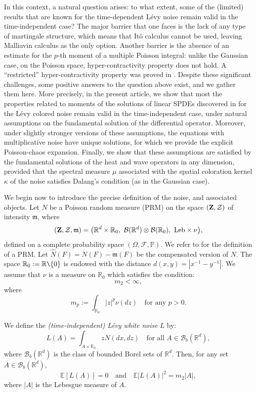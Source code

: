 \documentclass[12pt]{article}
\def\cB{\mathcal{B}}
\def\cF{\mathcal{F}}
\def\cZ{\mathcal{Z}}
\def\bE{\mathbb{E}}
\def\bP{\mathbb{P}}
\def\bR{\mathbb{R}}
\def\k{\kappa}
\newcommand{\fm}{\mathfrak{m}}
\begin{document}
In this context, a natural question arises: to what extent, some of the (limited) results that are known for the time-dependent L\'evy noise remain valid in the time-independent case? The major barrier that one faces is the lack of any type of martingale structure, which means that It\^o calculus cannot be used, leaving Malliavin calculus as the only option. Another barrier is the absence of an estimate for the $p$-th moment of a multiple Poisson integral: unlike the Gaussian case, on the Poisson space, hyper-contractivity property does not hold. A ``restricted'' hyper-contractivity property was proved in \cite{NPY19}. Despite these significant challenges, some positive answers to the question above exist, and we gather them here. More precisely, in the present article, we show that most the properties related to moments of the solutions of  linear SPDEs discovered in \cite{BJ26} for the L\'evy colored noise remain valid in the time-independent case, under natural assumptions on the fundamental solution of the differential operator. Moreover, under slightly stronger versions of these assumptions, the equations with multiplicative noise have unique solutions, for which we provide the explicit Poisson-chaos expansion. Finally, we show that these assumptions are satisfied by the fundamental solutions of the heat and wave operators in any dimension, provided that the spectral measure $\mu$ associated with the spatial coloration kernel $\k$ of the noise satisfies Dalang's condition (as in the Gaussian case).


\medskip

We begin now to introduce the precise definition of the noise, and associated objects.
Let $N$ be a Poisson random measure (PRM) on the space $({\bf Z},\cZ)$ of intensity $\fm$, where
\begin{equation}
\label{def-Z}
({\bf Z},\cZ,\fm)=\big(\bR^d \times \bR_0,\ \cB(\bR^d) \otimes \cB(\bR_0), \ {\rm Leb} \times \nu\big),
\end{equation}
defined on a complete probability space $(\Omega,\cF,\bP)$. We refer to \cite{resnick07} for the definition of a PRM. Let $\widehat{N}(F)=N(F)-\fm(F)$ be the compensated version of $N$. The space $\bR_0:=\bR \verb2\2 \{0\}$ is endowed with the distance $d(x,y)=|x^{-1}-y^{-1}|$. We assume that $\nu$ is a measure on $\bR_0$ which satisfies the condition:
\[
m_2<\infty,
\]
where
\[
m_p:=\int_{\bR_0}|z|^p \nu(dz) \quad \mbox{for any $p>0$}.
\]


\medskip

We define the {\em (time-independent) L\'evy white noise} $L$ by:
\begin{equation}
\label{def-L}
L(A)=\int_{A \times \bR_0}z \widehat{N}(dx,dz) \quad \mbox{for all $A \in \cB_b(\bR^d)$},
\end{equation}
where $\cB_b(\bR^d)$ is the class of bounded Borel sets of $\bR^d$. Then, for any set $A \in \cB_b(\bR^d)$, 
\[
\bE[L(A)]=0 \quad \mbox{and} \quad \bE|L(A)|^2=m_2|A|,
\] where $|A|$ is the Lebesgue measure of $A$.
\end{document}
